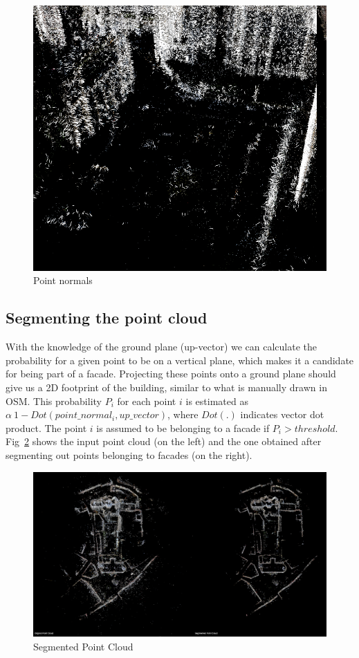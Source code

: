 \documentclass[10pt,twocolumn,letterpaper]{article}
\begin{document}
\begin{figure}[h]
   \centering
   \includegraphics[width=\linewidth]{images/point_normals.png}
   \caption{Point normals}
   \label{fig:normals}
\end{figure}

\subsection{Segmenting the point cloud}
With the knowledge of the ground plane (up-vector) we can calculate the probability for a given point to be on a vertical plane, which makes it a candidate for being part of a facade. Projecting these points onto a ground plane should give us a 2D footprint of the building, similar to what is manually drawn in OSM. This probability $P_{i}$ for each point $i$ is estimated as $\alpha \ 1 - \textit{Dot}(point\_normal_i, up\_vector)$, where $\textit{Dot}(.)$ indicates vector dot product. The point $i$ is assumed to be belonging to a facade if $P_{i} > threshold$. Fig~\ref{fig:seg_cloud} shows the input point cloud (on the left) and the one obtained after segmenting out points belonging to facades (on the right).

\begin{figure}[h]
   \centering
   \includegraphics[width=\linewidth]{images/pcl_segmentation.png}
   \caption{Segmented Point Cloud}
   \label{fig:seg_cloud}
\end{figure}
\end{document}
